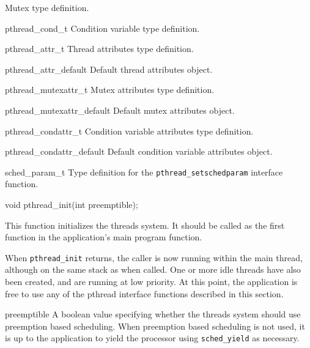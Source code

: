 \begin{apidesc}
\begin{icsymlist}
		Mutex type definition.
	\item[pthread_cond_t]
		Condition variable type definition.
	\item[pthread_attr_t]
		Thread attributes type definition.
	\item[pthread_attr_default]
		Default thread attributes object.
	\item[pthread_mutexattr_t]
		Mutex attributes type definition.
	\item[pthread_mutexattr_default]
		Default mutex attributes object.
	\item[pthread_condattr_t]
		Condition variable attributes type definition.
	\item[pthread_condattr_default]
		Default condition variable attributes object.
	\item[sched_param_t]
		Type definition for the {\tt pthread_setschedparam}
		interface function.
	\end{icsymlist}
\end{apidesc}

\label{pthread-init}
\begin{apisyn}

	\funcproto void pthread_init(int preemptible);
\end{apisyn}
\begin{apidesc}
	This function initializes the threads system. It should be called
	as the first function in the application's main program function.

	When {\tt pthread_init} returns, the caller is now running within
	the main thread, although on the same stack as when called. One or
	more idle threads have also been created, and are running at low
	priority. At this point, the application is free to use any of the
	pthread interface functions described in this section.

\end{apidesc}
\begin{apiparm}
	\item[preemptible]
		A boolean value specifying whether the threads system
		should use preemption based scheduling. When preemption
		based scheduling is not used, it is up to the application
		to yield the processor using {\tt sched_yield} as necessary.
\end{apiparm}


